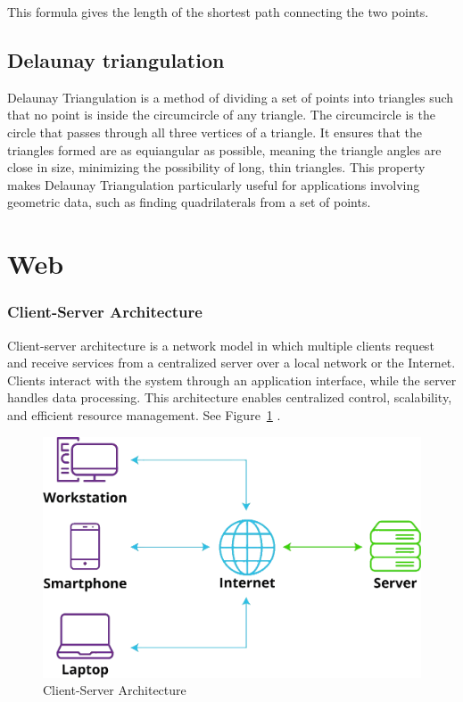 {This formula gives the length of the shortest path connecting the two points.


\subsection{Delaunay triangulation}

Delaunay Triangulation is a method of dividing a set of points into triangles such that no point is inside the circumcircle of any triangle. The circumcircle is the circle that passes through all three vertices of a triangle. It ensures that the triangles formed are as equiangular as possible,  meaning the triangle angles are close in size, minimizing the possibility of long, thin triangles. This property makes Delaunay Triangulation particularly useful for applications involving geometric data, such as finding quadrilaterals from a set of points.



\section{Web}
\label{subsec:web}


\subsubsection*{Client-Server Architecture}
\label{subsubsec:client-server}

Client-server architecture is a network model in which multiple clients request and receive services from a centralized server over a local network or the Internet. Clients interact with the system through an application interface, while the server handles data processing. This architecture enables centralized control, scalability, and efficient resource management. See Figure~\ref{fig:client-server-architecture} \cite{liquidweb:client-server}.


\begin{figure}[h!]
    \centering
    \includegraphics[width=0.75\linewidth]{figures/theory/client-server-architecture.png}
    \caption[Client-Server Architecture]{Client-Server Architecture \cite{liquidweb:client-server}}
    \label{fig:client-server-architecture}
\end{figure}

}
